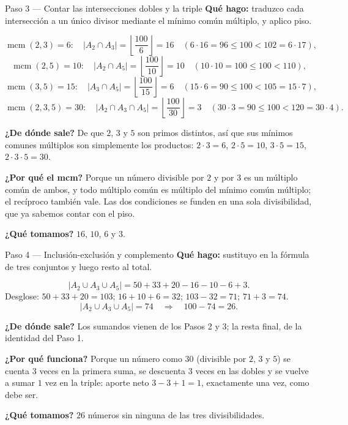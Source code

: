 \documentclass[11pt]{article}
\begin{document}
\begin{paso}{Paso 3 --- Contar las intersecciones dobles y la triple}
\textbf{Qué hago:} traduzco cada intersección a un único divisor mediante el mínimo común múltiplo, y aplico piso.

\[
\operatorname{mcm}(2,3)=6:\quad |A_2\cap A_3| = \left\lfloor \frac{100}{6}\right\rfloor = 16 \quad (6\cdot 16 = 96\le 100 < 102 = 6\cdot 17),
\]
\[
\operatorname{mcm}(2,5)=10:\quad |A_2\cap A_5| = \left\lfloor \frac{100}{10}\right\rfloor = 10 \quad (10\cdot 10 = 100 \le 100 < 110),
\]
\[
\operatorname{mcm}(3,5)=15:\quad |A_3\cap A_5| = \left\lfloor \frac{100}{15}\right\rfloor = 6 \quad (15\cdot 6 = 90\le 100 < 105 = 15\cdot 7),
\]
\[
\operatorname{mcm}(2,3,5)=30:\quad |A_2\cap A_3\cap A_5| = \left\lfloor \frac{100}{30}\right\rfloor = 3 \quad (30\cdot 3 = 90\le 100 < 120 = 30\cdot 4).
\]

\textbf{¿De dónde sale?} De que $2$, $3$ y $5$ son primos distintos, así que sus mínimos comunes múltiplos son simplemente los productos: $2\cdot3=6$, $2\cdot5=10$, $3\cdot5=15$, $2\cdot3\cdot5=30$.

\textbf{¿Por qué el mcm?} Porque un número divisible por $2$ y por $3$ es un múltiplo común de ambos, y todo múltiplo común es múltiplo del mínimo común múltiplo; el recíproco también vale. Las dos condiciones se funden en una sola divisibilidad, que ya sabemos contar con el piso.

\textbf{¿Qué tomamos?} $16$, $10$, $6$ y $3$.
\end{paso}

\begin{paso}{Paso 4 --- Inclusión-exclusión y complemento}
\textbf{Qué hago:} sustituyo en la fórmula de tres conjuntos y luego resto al total.

\[
|A_2\cup A_3\cup A_5| = 50+33+20 - 16 - 10 - 6 + 3 .
\]
Desglose: $50+33+20 = 103$; $16+10+6 = 32$; $103-32 = 71$; $71+3 = 74$.
\[
|A_2\cup A_3\cup A_5| = 74 \quad\Longrightarrow\quad 100 - 74 = 26 .
\]

\textbf{¿De dónde sale?} Los sumandos vienen de los Pasos 2 y 3; la resta final, de la identidad del Paso 1.

\textbf{¿Por qué funciona?} Porque un número como $30$ (divisible por $2$, $3$ y $5$) se cuenta $3$ veces en la primera suma, se descuenta $3$ veces en las dobles y se vuelve a sumar $1$ vez en la triple: aporte neto $3-3+1=1$, exactamente una vez, como debe ser.

\textbf{¿Qué tomamos?} $26$ números sin ninguna de las tres divisibilidades.
\end{paso}
\end{document}
